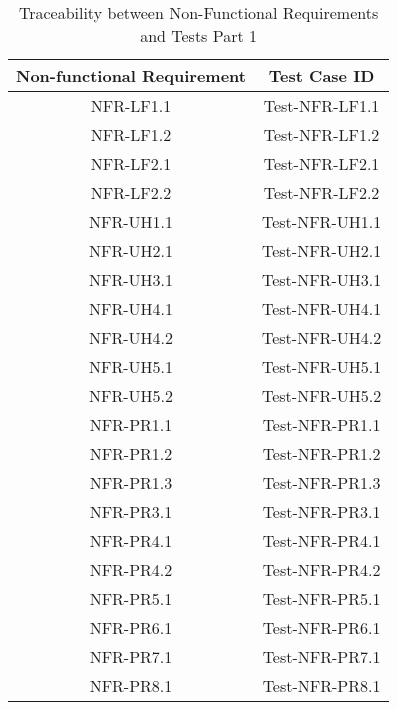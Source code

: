 \documentclass[12pt, titlepage]{article}
\begin{document}
\begin{table}[H]
    \centering
    \begin{tabular}{|c|c|}
    \hline
    Non-functional Requirement & Test Case ID\\
    \hline
    NFR-LF1.1 & Test-NFR-LF1.1\\
    \hline
    NFR-LF1.2 & Test-NFR-LF1.2\\
    \hline
    NFR-LF2.1 & Test-NFR-LF2.1\\
    \hline
    NFR-LF2.2 & Test-NFR-LF2.2\\
    \hline
    NFR-UH1.1 & Test-NFR-UH1.1\\
    \hline
    NFR-UH2.1 & Test-NFR-UH2.1\\
    \hline
    NFR-UH3.1 & Test-NFR-UH3.1\\
    \hline
    NFR-UH4.1 & Test-NFR-UH4.1\\
    \hline
    NFR-UH4.2 & Test-NFR-UH4.2\\
    \hline
    NFR-UH5.1 & Test-NFR-UH5.1\\
    \hline
    NFR-UH5.2 & Test-NFR-UH5.2\\
    \hline
    NFR-PR1.1 & Test-NFR-PR1.1\\
    \hline
    NFR-PR1.2 & Test-NFR-PR1.2\\
    \hline
    NFR-PR1.3 & Test-NFR-PR1.3\\
    \hline
    NFR-PR3.1 & Test-NFR-PR3.1\\
    \hline
    NFR-PR4.1 & Test-NFR-PR4.1\\
    \hline
    NFR-PR4.2 & Test-NFR-PR4.2\\
    \hline
    NFR-PR5.1 & Test-NFR-PR5.1\\
    \hline
    NFR-PR6.1 & Test-NFR-PR6.1\\
    \hline
    NFR-PR7.1 & Test-NFR-PR7.1\\
    \hline
    NFR-PR8.1 & Test-NFR-PR8.1\\
    \hline
    \end{tabular}
    \caption{Traceability between Non-Functional Requirements and Tests Part 1}
\end{table}

\newpage
\end{document}
